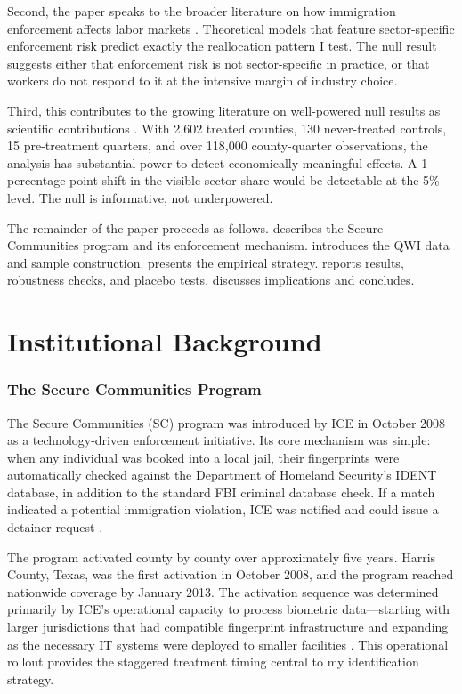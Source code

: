\documentclass[12pt]{article}
\begin{document}
Second, the paper speaks to the broader literature on how immigration enforcement affects labor markets \citep{borjas2017labor, peri2012effect, chassamboulli2014labor}. Theoretical models that feature sector-specific enforcement risk \citep{chassamboulli2014labor} predict exactly the reallocation pattern I test. The null result suggests either that enforcement risk is not sector-specific in practice, or that workers do not respond to it at the intensive margin of industry choice.

Third, this contributes to the growing literature on well-powered null results as scientific contributions \citep{abadie2020statistical}. With 2,602 treated counties, 130 never-treated controls, 15 pre-treatment quarters, and over 118,000 county-quarter observations, the analysis has substantial power to detect economically meaningful effects. A 1-percentage-point shift in the visible-sector share would be detectable at the 5\% level. The null is informative, not underpowered.

The remainder of the paper proceeds as follows.  describes the Secure Communities program and its enforcement mechanism.  introduces the QWI data and sample construction.  presents the empirical strategy.  reports results, robustness checks, and placebo tests.  discusses implications and concludes.


\section{Institutional Background}
\label{sec:background}

\subsubsection*{The Secure Communities Program} The Secure Communities (SC) program was introduced by ICE in October 2008 as a technology-driven enforcement initiative. Its core mechanism was simple: when any individual was booked into a local jail, their fingerprints were automatically checked against the Department of Homeland Security's IDENT database, in addition to the standard FBI criminal database check. If a match indicated a potential immigration violation, ICE was notified and could issue a detainer request \citep{cox2014policing}.

The program activated county by county over approximately five years. Harris County, Texas, was the first activation in October 2008, and the program reached nationwide coverage by January 2013. The activation sequence was determined primarily by ICE's operational capacity to process biometric data---starting with larger jurisdictions that had compatible fingerprint infrastructure and expanding as the necessary IT systems were deployed to smaller facilities \citep{miles2014does}. This operational rollout provides the staggered treatment timing central to my identification strategy.
\end{document}
